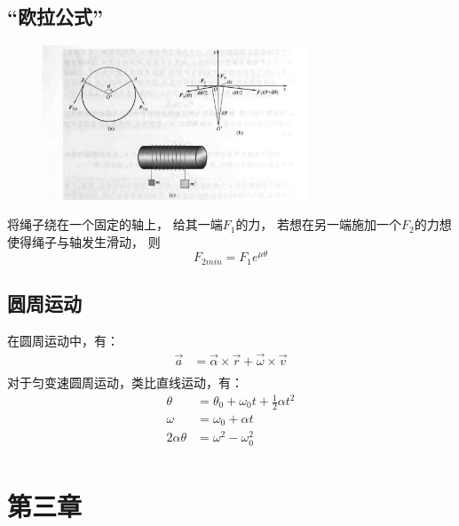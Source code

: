 \documentclass{ctexart}
\begin{document}
\subsection{“欧拉公式”}
\begin{figure}[H]
    \centering
    \includegraphics[width=0.7\textwidth]{img/ola.jpg}
\end{figure}
将绳子绕在一个固定的轴上，
给其一端$F_1$的力，
若想在另一端施加一个$F_2$的力想使得绳子与轴发生滑动，
则
$$
    F_{2min} = F_1 e^{\mu \theta}
$$
\subsection{圆周运动}
在圆周运动中，有：
\begin{align*}
    \vec{a} &= \vec{\alpha} \times \vec{r} + \vec{\omega} \times \vec{v} \\
\end{align*}
对于匀变速圆周运动，类比直线运动，有：
\begin{align*}
    \theta &= \theta_0 + \omega_0 t + \frac{1}{2} \alpha t^2 \\
    \omega &= \omega_0 + \alpha t \\
    2 \alpha \theta &= \omega^2 - \omega_0^2 \\
\end{align*}
\section{第三章}
\end{document}
